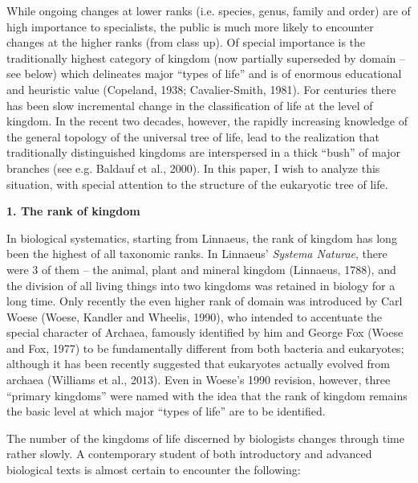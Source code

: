 \documentclass[a4paper]{article}
\begin{document}
While ongoing changes at lower ranks (i.e. species, genus, family and order) are of high importance to specialists, the
public is much more likely to encounter changes at the higher ranks (from class up). Of special importance is the
traditionally highest category of kingdom (now partially superseded by domain – see below) which delineates major
“types of life” and is of enormous educational and heuristic value \label{ref:RND3zNGphpm9n}(Copeland, 1938;
Cavalier-Smith, 1981). For centuries there has been slow incremental change in the classification of life at the level
of kingdom. In the recent two decades, however, the rapidly increasing knowledge of the general topology of the
universal tree of life, lead to the realization that traditionally distinguished kingdoms are interspersed in a thick
“bush” of major branches \label{ref:RNDASUVezikg7}(see e.g. Baldauf et al., 2000). In this paper, I wish to analyze
this situation, with special attention to the structure of the eukaryotic tree of life. 

{\bfseries
1. The rank of kingdom}

In biological systematics, starting from Linnaeus, the rank of kingdom has long been the highest of all taxonomic ranks.
In Linnaeus’ \textit{Systema Naturae}, there were 3 of them – the animal, plant and mineral kingdom
\label{ref:RND6bXO1caZ3A}(Linnaeus, 1788), and the division of all living things into two kingdoms was retained in
biology for a long time. Only recently the even higher rank of domain was introduced by Carl Woese
\label{ref:RNDDiuS3oKKqs}(Woese, Kandler and Wheelis, 1990), who intended to accentuate the special character of
Archaea, famously identified by him and George Fox \label{ref:RNDIQY6gpSHPx}(Woese and Fox, 1977) to be fundamentally
different from both bacteria and eukaryotes; although it has been recently suggested that eukaryotes actually evolved
from archaea \label{ref:RND5ULE3HHm08}(Williams et al., 2013). Even in Woese’s 1990 revision, however, three “primary
kingdoms” were named with the idea that the rank of kingdom remains the basic level at which major “types of life” are
to be identified.

The number of the kingdoms of life discerned by biologists changes through time rather slowly. A contemporary student of
both introductory and advanced biological texts is almost certain to encounter the following:
\end{document}
